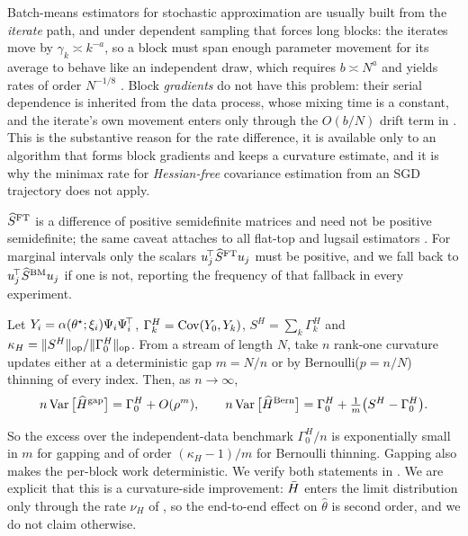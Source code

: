 \begin{remark}
\label{rem:whyfast}
Batch-means estimators for stochastic approximation are usually built from the \emph{iterate} path, and
under dependent sampling that forces long blocks: the iterates move by $\gamma_k\asymp k^{-a}$, so a block
must span enough parameter movement for its average to behave like an independent draw, which requires
$b\asymp N^{a}$ and yields rates of order $N^{-1/8}$
\citep[Prop.~2, Cor.~2]{samsonov2025statistical}. Block \emph{gradients} do not have this problem: their
serial dependence is inherited from the data process, whose mixing time is a constant, and the iterate's own
movement enters only through the $O(b/N)$ drift term in . This is the substantive reason for
the rate difference, it is available only to an algorithm that forms block gradients and keeps a curvature
estimate, and it is why the minimax rate for \emph{Hessian-free} covariance estimation from an SGD
trajectory \citep{ni2026online} does not apply.
\end{remark}

\begin{remark}
\label{rem:psd}
$\widehat{S}^{\mathrm{FT}}$ is a difference of positive semidefinite matrices and need not be positive semidefinite; the
same caveat attaches to all flat-top and lugsail estimators \citep[Remark~5]{singh2025utility}. For
marginal intervals only the scalars $u_j^{\!\top}\widehat{S}^{\mathrm{FT}} u_j$ must be positive, and we fall back to
$u_j^{\!\top}\widehat{S}^{\mathrm{BM}} u_j$ if one is not, reporting the frequency of that fallback in every experiment.
\end{remark}

\begin{proposition}
\label{prop:gap}
Let $Y_i=\alpha(\theta^\star;\xi_i)\Psi_i\Psi_i^{\!\top}$, $\Gamma^H_k=\operatorname{Cov}(Y_0,Y_k)$,
$S^H=\sum_k\Gamma^H_k$ and $\kappa_H=\lVert S^H \rVert_{\mathrm{op}}/\lVert \Gamma^H_0 \rVert_{\mathrm{op}}$. From a stream of
length $N$, take $n$ rank-one curvature updates either at a deterministic gap $m=N/n$ or
by Bernoulli($p=n/N$) thinning of every index. Then, as $n\to\infty$,
\[
n\operatorname{Var}\big[\widehat{H}^{\mathrm{gap}}\big]=\Gamma_0^H+O(\rho^{m}),
\qquad
n\operatorname{Var}\big[\widehat{H}^{\mathrm{Bern}}\big]=\Gamma^H_0+\tfrac{1}{m}\big(S^H-\Gamma^H_0\big).
\]
\end{proposition}

So the excess over the independent-data benchmark $\Gamma_0^H/n$ is exponentially small in
$m$ for gapping and of order $(\kappa_H-1)/m$ for Bernoulli thinning. Gapping also makes
the per-block work deterministic. We verify both statements in \RefGapFig{}. We are
explicit that this is a curvature-side improvement: $\bar{H}$ enters the limit distribution
only through the rate $\nu_H$ of , so the end-to-end effect on
$\hat\theta$ is second order, and we do not claim otherwise.

